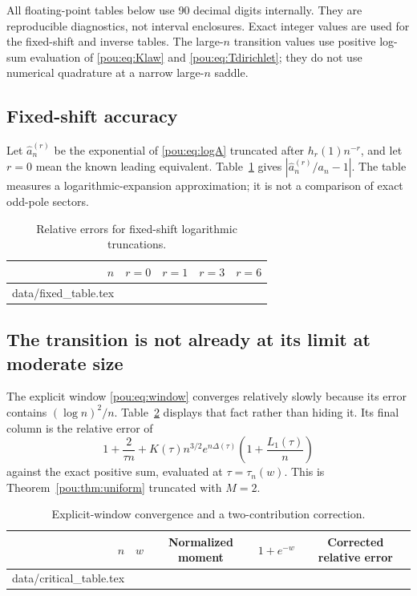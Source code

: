 \documentclass[11pt]{article}
\makeatletter
\theoremstyle{definition}
\theoremstyle{remark}
\newcommand{\tableinput}[1]{\@@input #1 }
\makeatother
\begin{document}
All floating-point tables below use 90 decimal digits internally.  They
are reproducible diagnostics, not interval enclosures.  Exact integer
values are used for the fixed-shift and inverse tables.  The large-$n$
transition values use positive log-sum evaluation of \eqref{pou:eq:Klaw} and
\eqref{pou:eq:Tdirichlet}; they do not use numerical quadrature at a narrow
large-$n$ saddle.

\subsection{Fixed-shift accuracy}

Let $\widehat a_n^{(r)}$ be the exponential of \eqref{pou:eq:logA} truncated
after $h_r(1)n^{-r}$, and let $r=0$ mean the known leading equivalent.
Table~\ref{pou:tab:fixed} gives $|\widehat a_n^{(r)}/a_n-1|$.
The table measures a logarithmic-expansion approximation; it is not a
comparison of exact odd-pole sectors.

\begin{table}[htbp]
\centering
\caption{Relative errors for fixed-shift logarithmic truncations.}
\label{pou:tab:fixed}
\begin{tabular}{rcccc}
\toprule
$n$ & $r=0$ & $r=1$ & $r=3$ & $r=6$\\
\midrule
\tableinput{data/fixed_table.tex}
\bottomrule
\end{tabular}
\end{table}

\subsection{The transition is not already at its limit at moderate size}

The explicit window \eqref{pou:eq:window} converges relatively slowly because
its error contains $(\log n)^2/n$.  Table~\ref{pou:tab:critical} displays that
fact rather than hiding it.  Its final column is the relative error of
\[
 1+\frac2{\tau n}+
 K(\tau)n^{3/2}e^{n\Delta(\tau)}\left(1+\frac{L_1(\tau)}n\right)
\]
against the exact positive sum, evaluated at $\tau=\tau_n(w)$.
This is Theorem~\ref{pou:thm:uniform} truncated with $M=2$.

\begin{table}[htbp]
\centering
\caption{Explicit-window convergence and a two-contribution correction.}
\label{pou:tab:critical}
\begin{tabular}{rrccc}
\toprule
$n$ & $w$ & Normalized moment & $1+e^{-w}$ & Corrected relative error\\
\midrule
\tableinput{data/critical_table.tex}
\bottomrule
\end{tabular}
\end{table}
\end{document}
